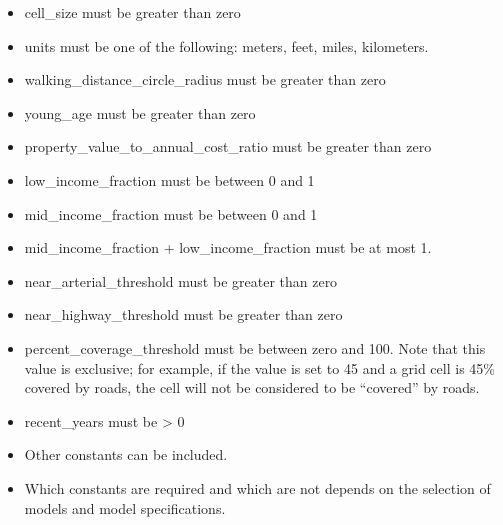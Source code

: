 \begin{itemize} \tight
\item cell_size must be greater than zero
\item units must be one of the following: meters, feet, miles, kilometers.
\item walking_distance_circle_radius must be greater than zero
\item young_age must be greater than zero
\item property_value_to_annual_cost_ratio must be greater than zero
\item low_income_fraction must be between 0 and 1
\item mid_income_fraction must be between 0 and 1
\item mid_income_fraction + low_income_fraction must be at most 1.
\item near_arterial_threshold must be greater than zero
\item near_highway_threshold must be greater than zero
\item percent_coverage_threshold must be between zero and 100. Note that this value is exclusive; for example, if the value is set to 45 and a grid cell is 45\% covered by roads, the cell will not be considered to be ``covered'' by roads.
\item recent_years must be \textgreater{} 0
\item Other constants can be included.
\item Which constants are required and which are not depends on the selection of models and model specifications.
\end{itemize}

